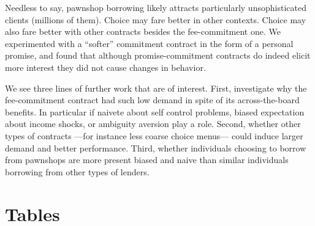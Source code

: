 \documentclass[11pt]{article}
\begin{document}
Needless to say, pawnshop borrowing likely attracts particularly unsophisticated clients (millions of them). Choice may fare better in other contexts.  Choice may also fare better with other contracts besides the fee-commitment one. We experimented with a ``softer'' commitment contract in the form of a personal promise, and found that although promise-commitment contracts do indeed elicit more interest they did not cause changes in behavior. 

We see three lines of further work that are of interest. First, investigate why the fee-commitment contract had such low demand in spite of its across-the-board benefits. In particular if naivete about self control problems, biased expectation about income shocks, or ambiguity aversion play a role. Second, whether other types of contracts ---for instance less coarse choice menus--- could induce larger demand and better performance. Third, whether individuals choosing to borrow from pawnshops are more present biased and naive than similar individuals borrowing from other types of lenders.







\pagebreak


\clearpage

%
%






\newpage
\singlespacing

\section{Tables}
\end{document}
